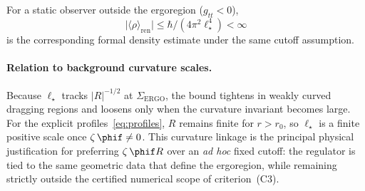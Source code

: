 For a static observer outside the ergoregion ($g_{tt}<0$),
\begin{equation}
\label{eq:rho-ren-bound}
\bigl|\langle\rho\rangle_{\mathrm{ren}}\bigr|
\le \hbar/(4\pi^{2}\ell_{\star}^{4}) < \infty
\end{equation}
is the corresponding formal density estimate under the same cutoff assumption.

\paragraph{Relation to background curvature scales.}
Because $\ell_{\star}$ tracks $|R|^{-1/2}$ at $\Sigma_{\mathrm{ERGO}}$, the bound
tightens in weakly curved dragging regions and loosens only when the curvature
invariant becomes large.
For the explicit profiles~\eqref{eq:profiles}, $R$ remains finite for $r>r_{0}$,
so $\ell_{\star}$ is a finite positive scale once $\zeta\,\phif\neq 0$.
This curvature linkage is the principal physical justification for preferring
$\zeta\,\phif R$ over an \emph{ad hoc} fixed cutoff: the regulator is tied to
the same geometric data that define the ergoregion, while remaining strictly
outside the certified numerical scope of criterion~(C3).
